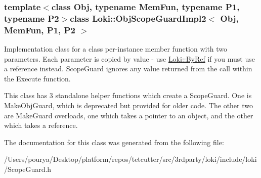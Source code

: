 \subsubsection*{template$<$class Obj, typename Mem\+Fun, typename P1, typename P2$>$class Loki\+::\+Obj\+Scope\+Guard\+Impl2$<$ Obj, Mem\+Fun, P1, P2 $>$}

Implementation class for a class per-\/instance member function with two parameters. Each parameter is copied by value -\/ use \hyperlink{group__ExceptionGroup_ga0a94ba0342e6abcdb8f9b32ed5ad7e3d}{Loki\+::\+By\+Ref} if you must use a reference instead. Scope\+Guard ignores any value returned from the call within the Execute function.

This class has 3 standalone helper functions which create a Scope\+Guard. One is Make\+Obj\+Guard, which is deprecated but provided for older code. The other two are Make\+Guard overloads, one which takes a pointer to an object, and the other which takes a reference. 

The documentation for this class was generated from the following file\+:\begin{DoxyCompactItemize}
\item 
/\+Users/pourya/\+Desktop/platform/repos/tetcutter/src/3rdparty/loki/include/loki/Scope\+Guard.\+h\end{DoxyCompactItemize}
